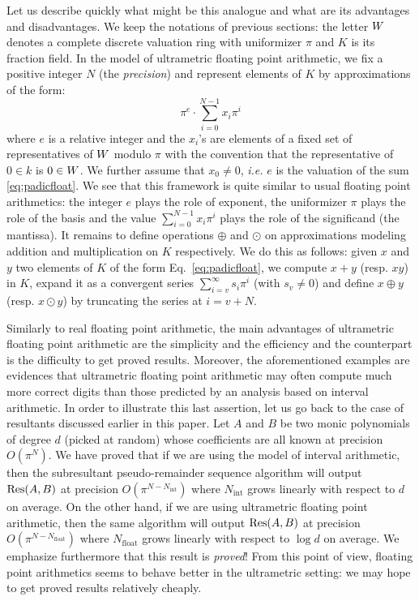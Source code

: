 \documentclass{article}
\begin{document}
Let us describe quickly what might be this analogue and what are its
advantages and disadvantages. We keep the notations of previous
sections: the letter $W$ denotes a complete discrete valuation ring
with uniformizer $\pi$ and $K$ is its fraction field.
In the model of ultrametric floating point arithmetic, we fix a
positive integer $N$ (the \emph{precision}) and represent elements 
of $K$ by approximations of the form:
\begin{equation}
\label{eq:padicfloat}
\pi^e \cdot \sum_{i=0}^{N-1} x_i \pi^i
\end{equation}
where $e$ is a relative integer and the $x_i$'s are elements of a fixed 
set of representatives of $W$ modulo $\pi$ with the convention that the 
representative of $0 \in k$ is $0 \in W$.
We further assume that $x_0 \neq 0$, \emph{i.e.} $e$ is the valuation
of the sum \eqref{eq:padicfloat}. We see that this framework is quite
similar to usual floating point arithmetics: the integer $e$ plays the
role of exponent, the uniformizer $\pi$ plays the role of the basis
and the value $\sum_{i=0}^{N-1} x_i \pi^i$ plays the role of the
significand (the mantissa). It remains to define operations $\oplus$
and $\odot$ on approximations modeling addition and multiplication
on $K$ respectively. We do this as follows: given $x$ and $y$ two
elements of $K$ of the form Eq.~\eqref{eq:padicfloat}, we compute
$x+y$ (resp. $xy$) in $K$, expand it as a convergent series 
$\sum_{i=v}^{\infty} s_i \pi^i$ (with $s_v \neq 0$) and define $x 
\oplus y$ (resp. $x \odot y$) by truncating the series at $i = v+N$.

Similarly to real floating point arithmetic, the main advantages of 
ultrametric floating point arithmetic are the simplicity and the 
efficiency and the counterpart is the difficulty to get proved results. 
Moreover, the aforementioned examples are evidences that ultrametric 
floating point arithmetic may often compute much more correct digits 
than those predicted by an analysis based on interval arithmetic. In 
order to illustrate this last assertion, let us go back to the case of 
resultants discussed earlier in this paper. Let $A$ and $B$ be two monic 
polynomials of degree $d$ (picked at random) whose coefficients are all 
known at precision $O(\pi^N)$. We have proved that if we are using the
model of interval arithmetic, then the subresultant pseudo-remainder
sequence algorithm will output $\text{\rm Res}(A,B)$ at precision 
$O(\pi^{N-N_{\text{int}}})$ where $N_{\text{int}}$ grows linearly 
with respect to $d$ on average. On the other hand, if we are using 
ultrametric floating point arithmetic, then the same algorithm will
output $\text{\rm Res}(A,B)$ at precision $O(\pi^{N-N_{\text{float}}})$ where 
$N_{\text{float}}$ grows linearly with respect to $\log d$ on average.
We emphasize furthermore that this result is \emph{proved}! From this
point of view, floating point arithmetics seems to behave better in
the ultrametric setting: we may hope to get proved results relatively
cheaply.
\end{document}
